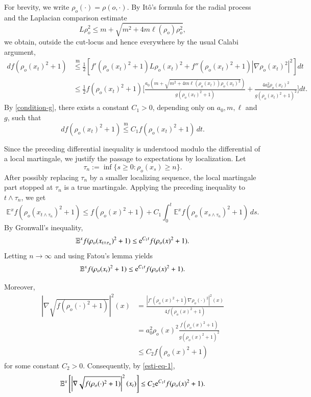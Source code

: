 \documentclass[11pt,twoside, reqno]{article}
\def\r{\right}
\def\l{\left}
\def\e{{\rm e}}
\newcommand\1{\mathbbm{1}}
\theoremstyle{definition}
\numberwithin{equation}{section}
\def \e{{\rm e}}
\begin{document}
For brevity, we write \(\rho_o(\cdot)=\rho(o,\cdot)\). By Itô's formula for
the radial process and the Laplacian comparison estimate
\[
        L\rho_o^2
        \leq
        m+\sqrt{m^2+4m\ell(\rho_o)\rho_o^2},
\]
we obtain, outside the cut-locus and hence everywhere by the usual Calabi
argument,
\[
\begin{aligned}
d f(\rho_o(x_t)^2+1)
&\overset{\text{m}}{\leq}
\frac12
\left[
        f'(\rho_o(x_t)^2+1)L\rho_o(x_t)^2
        +
        f''(\rho_o(x_t)^2+1)|\nabla\rho_o(x_t)^2|^2
\right]dt
\\
&\leq
\frac12 f(\rho_o(x_t)^2+1)
\Biggl[
        \frac{a_0\left(m+\sqrt{m^2+4m\ell(\rho_o(x_t))\rho_o(x_t)^2}\right)}
             {g(\rho_o(x_t)^2+1)}
        +
        \frac{4a_0^2\rho_o(x_t)^2}
             {g(\rho_o(x_t)^2+1)^2}
\Biggr]dt .
\end{aligned}
\]
By \eqref{condition-g}, there exists a constant \(C_1>0\), depending only on
\(a_0,m,\ell\) and \(g\), such that
\[
        d f(\rho_o(x_t)^2+1)
        \overset{\text{m}}{\leq}
        C_1 f(\rho_o(x_t)^2+1)\,dt .
\]

Since the preceding differential inequality is understood modulo the
differential of a local martingale, we justify the passage to expectations by
localization. Let
\[
        \tau_n:=\inf\{s\geq0:\rho_o(x_s)\geq n\}.
\]
After possibly replacing \(\tau_n\) by a smaller localizing sequence, the
local martingale part stopped at \(\tau_n\) is a true martingale. Applying the
preceding inequality to \(t\wedge\tau_n\), we get
\[
\mathbb E^x f(\rho_o(x_{t\wedge\tau_n})^2+1)
\leq
f(\rho_o(x)^2+1)
+
C_1\int_0^t
\mathbb E^x f(\rho_o(x_{s\wedge\tau_n})^2+1)\,ds .
\]
By Gronwall's inequality,
\[
\mathbb E^x f(\rho_o(x_{t\wedge\tau_n})^2+1)
\leq
\e^{C_1t}f(\rho_o(x)^2+1).
\]
Letting \(n\to\infty\) and using Fatou's lemma yields
\begin{equation}\label{esti-eq-1}
        \mathbb E^x f(\rho_o(x_t)^2+1)
        \leq
        \e^{C_1t}f(\rho_o(x)^2+1).
\end{equation}

Moreover,
\[
\begin{aligned}
\left|\nabla\sqrt{f(\rho_o(\cdot)^2+1)}\right|^2(x)
&=
\frac{\left|f'(\rho_o(x)^2+1)\nabla\rho_o(\cdot)^2\right|^2(x)}
     {4f(\rho_o(x)^2+1)}
\\
&=
a_0^2\rho_o(x)^2
\frac{f(\rho_o(x)^2+1)}
     {g(\rho_o(x)^2+1)^2}
\\
&\leq
C_2 f(\rho_o(x)^2+1)
\end{aligned}
\]
for some constant \(C_2>0\). Consequently, by \eqref{esti-eq-1},
\begin{equation}\label{esti-eq-2}
        \mathbb E^x
       \l[ \left|\nabla\sqrt{f(\rho_o(\cdot)^2+1)}\right|^2(x_t)\r]
        \leq
        C_2\e^{C_1t}f(\rho_o(x)^2+1).
\end{equation}
\end{document}
